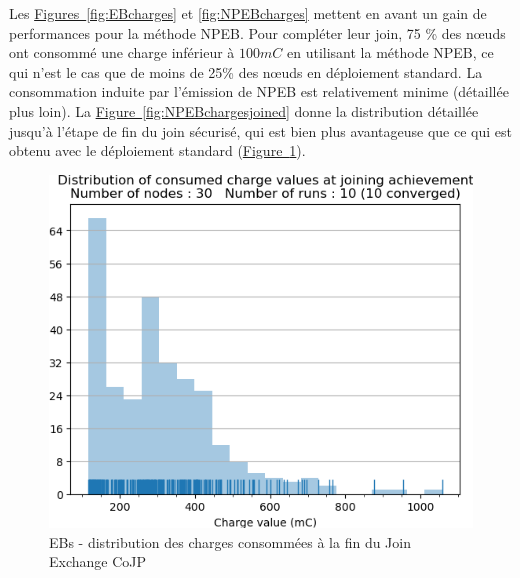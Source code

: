 \documentclass[]{report}
\newcommand{\wordlink}[2]{\hyperref[#2]{#1~\ref{#2}}}
\begin{document}
\vspace{0.2cm}


Les \wordlink{Figures}{fig:EBcharges} et \ref{fig:NPEBcharges} mettent en avant un gain de performances pour la méthode NPEB. Pour compléter leur join, 75 \% des nœuds ont consommé une charge inférieur à $100 mC$ en utilisant la méthode NPEB, ce qui n'est le cas que de moins de 25\% des nœuds en déploiement standard. La consommation induite par l'émission de NPEB est relativement minime (détaillée plus loin). La \wordlink{Figure}{fig:NPEBchargesjoined} donne la distribution détaillée jusqu'à l'étape de fin du join sécurisé, qui est bien plus avantageuse que ce qui est obtenu avec le déploiement standard (\wordlink{Figure}{fig:EBchargesjoined}).

\newpage

\begin{figure}[!ht]
	\begin{minipage}{0.49\textwidth}
		\centering
		\includegraphics[width=\textwidth]{results/EB/chargejoined.hist}
		\caption{EBs - distribution des charges consommées à la fin du Join Exchange CoJP}
		\label{fig:EBchargesjoined}
	\end{minipage}\hfill
	\begin{minipage}{0.5\textwidth}
		\centering

\end{minipage}
\end{figure}
\end{document}
